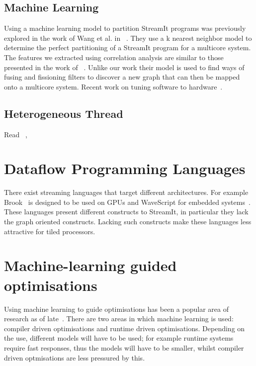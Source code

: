 \subsection{Machine Learning} 
Using a machine learning model to partition StreamIt programs was previously explored in the work of Wang et al. in ~\cite{wang2013partitionstreamit}.
They use a k nearest neighbor model to determine the perfect partitioning of a StreamIt program for a multicore system. 
The features we extracted using correlation analysis are similar to those presented in the work of ~\cite{wang2013partitionstreamit}.
Unlike our work their model is used to find ways of fusing and fissioning filters to discover a new graph that can then be mapped onto a multicore system.
Recent work on tuning software to hardware~\cite{cummins2017pact}.

\subsection{Heterogeneous Thread}
Read ~\cite{becchi2006ThreadOnCore}, ~\cite{adileh2016power}

\section{Dataflow Programming Languages}

There exist streaming languages that target different architectures.
For example Brook~\cite{buck2004brook} is designed to be used on GPUs and WaveScript for embedded systems~\cite{newton2008wavescript}.
These languages present different constructs to StreamIt, in particular they lack the graph oriented constructs. 
Lacking such constructs make these languages less attractive for tiled processors.


\section{Machine-learning guided optimisations}

Using machine learning to guide optimisations has been a popular area of research as of late~\cite{cummins2017pact,wang2018ml,dubach13dynamic}.
There are two areas in which machine learning is used: compiler driven optimisations and runtime driven optimisations.
Depending on the use, different models will have to be used; for example runtime systems require fast responses, thus the models will have to be smaller, whilst compiler driven optmisations are less pressured by this.













